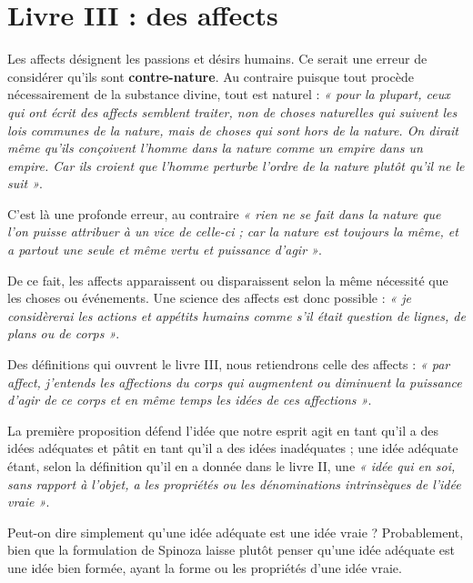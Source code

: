 
\section{Livre III : des affects}

Les affects désignent les passions et désirs humains. Ce serait une erreur de
considérer qu’ils sont {\bf contre-nature}. Au contraire puisque tout procède
nécessairement de la substance divine, tout est naturel : {\it « pour la plupart,
ceux qui ont écrit des affects semblent traiter, non de choses naturelles qui
suivent les lois communes de la nature, mais de choses qui sont hors de la
nature. On dirait même qu’ils conçoivent l’homme dans la nature comme un
empire dans un empire. Car ils croient que l’homme perturbe l’ordre de la
nature plutôt qu’il ne le suit »}.

C’est là une profonde erreur, au contraire {\it « rien ne se fait dans la nature
que l’on puisse attribuer à un vice de celle-ci ; car la nature est toujours
la même, et a partout une seule et même vertu et puissance d’agir »}.

\vspace{0.5cm}
De ce fait, les affects apparaissent ou disparaissent selon la même nécessité
que les choses ou événements. Une science des affects est donc possible : {\it « je
considèrerai les actions et appétits humains comme s’il était question de
lignes, de plans ou de corps »}.

Des définitions qui ouvrent le livre III, nous retiendrons celle des affects :
{\it « par affect, j’entends les affections du corps qui augmentent ou diminuent la
puissance d’agir de ce corps et en même temps les idées de ces affections »}.

\vspace{0.5cm}
La première proposition défend l’idée que notre esprit agit en tant qu’il a des
idées adéquates et pâtit en tant qu’il a des idées inadéquates ; une idée
adéquate étant, selon la définition qu’il en a donnée dans le livre II, une
{\it « idée qui en soi, sans rapport à l’objet, a les propriétés ou les dénominations
intrinsèques de l’idée vraie »}.

Peut-on dire simplement qu’une idée adéquate est une idée vraie ? Probablement,
bien que la formulation de Spinoza laisse plutôt penser qu’une idée adéquate
est une idée bien formée, ayant la forme ou les propriétés d’une idée vraie.

